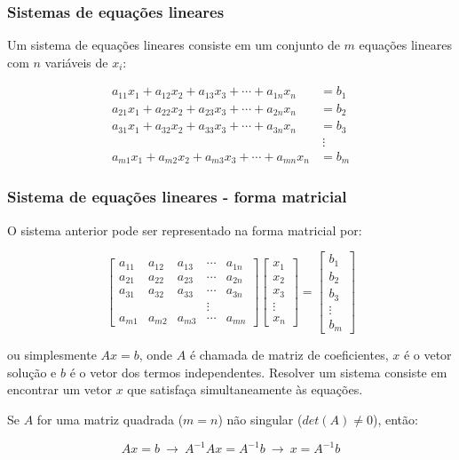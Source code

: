 \begin{frame}
    \frametitle{Sistemas de equações lineares}
    Um sistema de equações lineares consiste em um conjunto de $m$ equações lineares com $n$ variáveis de $x_i$:

    \begin{align*}
        a_{11} x_1 + a_{12} x_2 + a_{13} x_3 + \cdots  + a_{1n} x_n & =  b_1 \\
        a_{21} x_1 + a_{22} x_2 + a_{23} x_3 + \cdots + a_{2n} x_n & =  b_2 \\
        a_{31} x_1 + a_{32} x_2 + a_{33} x_3 + \cdots + a_{3n} x_n & = b_3 \\
                                                                   & ~\vdots~ \\
        a_{m1} x_1 + a_{m2} x_2 + a_{m3} x_3 + \cdots  + a_{mn} x_n & =  b_m
    \end{align*}
\end{frame}

\begin{frame}
    \frametitle{Sistema de equações lineares - forma matricial}
    O sistema anterior pode ser representado na forma matricial por:

    \[
        \begin{bmatrix}
            a_{11} & a_{12} & a_{13} & \cdots & a_{1n}  \\
            a_{21} & a_{22} & a_{23} & \cdots & a_{2n}  \\
            a_{31} & a_{32} & a_{33} & \cdots & a_{3n}  \\
                   &        &        & \vdots &         \\
            a_{m1} & a_{m2} & a_{m3} & \cdots & a_{mn}
        \end{bmatrix}
        \begin{bmatrix}
            x_1 \\ x_2 \\ x_3 \\ \vdots \\ x_n
        \end{bmatrix}=
        \begin{bmatrix}
            b_1 \\ b_2 \\ b_3 \\ \vdots \\ b_m
        \end{bmatrix}
    \]

    ou simplesmente $Ax=b$, onde $A$ é chamada de matriz de coeficientes, $x$ é o vetor solução e $b$ é o vetor dos termos independentes. Resolver um sistema consiste em encontrar um vetor $x$ que satisfaça simultaneamente às equações.

    \pause 

    Se $A$ for uma matriz quadrada ($m = n$) não singular ($det(A) \neq 0$), então:

    \[
        Ax=b ~\rightarrow~ A^{-1}Ax=A^{-1}b ~\rightarrow~ x=A^{-1}b
    \]
\end{frame}

